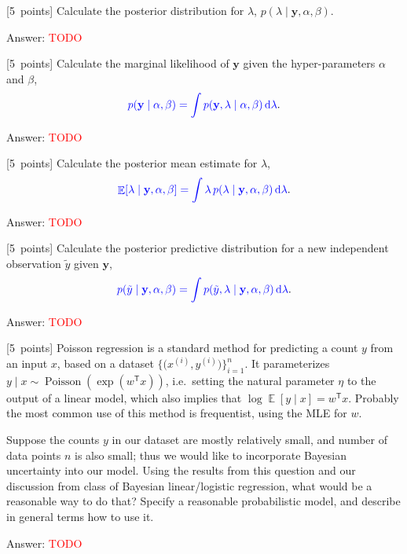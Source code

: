 \documentclass{article}
\newcommand{\ask}[1]{\textcolor{question}{#1}}
\newenvironment{answer}{\par\begingroup\color{answer}Answer: }{\endgroup}
\newcommand{\red}[1]{\textcolor{red}{#1}}
\newcommand{\pts}[1]{\textcolor{points}{[#1~points]}}
\newcommand{\TODO}{\red{TODO}}
\DeclareMathOperator*{\E}{\mathbb{E}}
\newcommand{\by}{\mathbf{y}}
\newcommand{\tp}{^\mathsf{T}}
\newcommand{\ud}{\,\mathrm{d}}
\newcommand{\toth}[1]{^{(#1)}}
\newcommand{\ith}{\toth{i}}
\DeclareMathOperator{\Poisson}{Poisson}
\begin{document}
\begin{qlist}

\item \pts{5} Calculate the posterior distribution for $\lambda$, \ask{$p(\lambda \mid \by, \alpha, \beta)$}.

\begin{answer}\TODO\end{answer}

\item \pts{5} Calculate the marginal likelihood of $\by$ given the hyper-parameters $\alpha$ and $\beta$,
\[ \ask{ p(\by \mid \alpha, \beta) = \int p(\by, \lambda \mid \alpha, \beta) \ud\lambda  }. \]

\begin{answer}\TODO\end{answer}

\item \pts{5} Calculate the posterior mean estimate for $\lambda$,
\[ \ask{ \E[\lambda \mid \by, \alpha, \beta] = \int \lambda \, p(\lambda \mid \by,\alpha,\beta) \ud\lambda }. \]

\begin{answer}\TODO\end{answer}


\item \pts{5} Calculate the posterior predictive distribution for a new independent observation $\tilde{y}$ given $\by$,
\[ \ask{ p(\tilde{y} \mid \by, \alpha, \beta) = \int p(\tilde{y},\lambda\mid \by,\alpha,\beta) \ud\lambda  }. \]


\begin{answer}\TODO\end{answer}


\item \pts{5}
Poisson regression is a standard method for predicting a count $y$ from an input $x$,
based on a dataset $\bigl\{ \bigl(x\ith, y\ith\bigr) \bigr\}_{i=1}^n$.
It parameterizes $y \mid x \sim \Poisson(\exp(w\tp x))$,
i.e.\ setting the natural parameter $\eta$ to the output of a linear model,
which also implies that $\log \E[y \mid x] = w\tp x$.
Probably the most common use of this method is frequentist,
using the MLE for $w$.

Suppose the counts $y$ in our dataset are mostly relatively small, and number of data points $n$ is also small;
thus we would like to incorporate Bayesian uncertainty into our model.
Using the results from this question and our discussion from class of Bayesian linear/logistic regression,
\ask{what would be a reasonable way to do that?}
Specify a reasonable probabilistic model, and describe in general terms how to use it.

\begin{answer}\TODO\end{answer}

\end{qlist}
\end{document}
